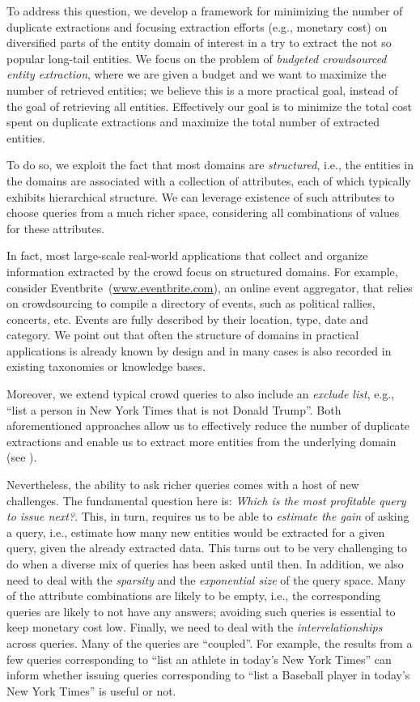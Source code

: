 To address this question, we develop a framework for minimizing the number of duplicate extractions and focusing extraction efforts (e.g., monetary cost) on diversified parts of the entity domain of interest in a try to extract the not so popular long-tail entities. We focus on the problem of {\em budgeted crowdsourced entity extraction}, where we are given a budget and we want to maximize the number of retrieved entities; we believe this is a more practical goal, instead of the goal of retrieving all entities.  Effectively our goal is to minimize the total cost spent on duplicate extractions and maximize the total number of extracted entities. 

To do so, we exploit the fact that most domains are {\em structured}, i.e., the entities in the domains are associated with a collection of attributes, each of which typically exhibits hierarchical structure. We can leverage existence of such attributes to choose queries from a much richer space, considering all combinations of values for these attributes.

In fact, most large-scale real-world applications that collect and organize information extracted by the crowd focus on structured domains. For example, consider Eventbrite~(\url{www.eventbrite.com}), an online event aggregator, that relies on crowdsourcing to compile a directory of events, such as political rallies, concerts, etc. Events are fully described by their location, type, date and category. We point out that often the structure of domains in practical applications is already known by design and in many cases is also recorded in existing taxonomies or knowledge bases. 

Moreover, we extend typical crowd queries to also include an {\em exclude list}, e.g., ``list a person in New York Times that is not Donald Trump''. Both aforementioned approaches allow us to effectively reduce the number of duplicate extractions and enable us to extract more entities from the underlying domain (see ).

Nevertheless, the ability to ask richer queries comes with a host of new challenges. The fundamental question here is: {\em Which is the most profitable query to issue next?}. This, in turn, requires us to be able to {\em estimate the gain} of asking a query, i.e., estimate how many new entities would be extracted for a given query, given the already extracted data. This turns out to be very challenging to do when a diverse mix of queries has been asked until then. In addition, we also need to deal with the {\em sparsity} and the {\em exponential size} of the query space. Many of the attribute combinations are likely to be empty, i.e., the corresponding queries are likely to not have any answers; avoiding such queries is essential to keep monetary cost low. Finally, we need to deal with the {\em interrelationships} across queries. Many of the queries are ``coupled''. For example, the results from a few queries corresponding to ``list an athlete in today's New York Times'' can inform whether issuing queries corresponding to ``list a Baseball player in today's New York Times'' is useful or not. 

